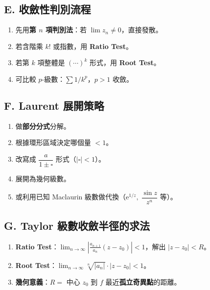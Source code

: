 \documentclass[12pt,a4paper]{article}
\newcommand{\ee}{\mathrm{e}}
\begin{document}
\subsection*{E. 收斂性判別流程}

\begin{enumerate}[nosep]
\item 先用\textbf{第 $n$ 項判別法}：若 $\lim z_n\ne 0$，直接發散。
\item 若含階乘 $k!$ 或指數，用 \textbf{Ratio Test}。
\item 若第 $k$ 項整體是 $(\cdots)^k$ 形式，用 \textbf{Root Test}。
\item 可比較 $p$-級數：$\sum 1/k^p$，$p>1$ 收斂。
\end{enumerate}

\subsection*{F. Laurent 展開策略}

\begin{enumerate}[nosep]
\item 做\textbf{部分分式}分解。
\item 根據環形區域決定哪個量 $<1$。
\item 改寫成 $\dfrac{a}{1\pm\square}$ 形式（$|\square|<1$）。
\item 展開為幾何級數。
\item 或利用已知 Maclaurin 級數做代換（$\ee^{1/z},\;\dfrac{\sin z}{z^n}$ 等）。
\end{enumerate}

\subsection*{G. Taylor 級數收斂半徑的求法}

\begin{enumerate}[nosep]
\item \textbf{Ratio Test}：$\displaystyle\lim_{n\to\infty}\left|\frac{a_{n+1}}{a_n}(z-z_0)\right|<1$，解出 $|z-z_0|<R$。
\item \textbf{Root Test}：$\displaystyle\lim_{n\to\infty}\sqrt[n]{|a_n|}\cdot|z-z_0|<1$。
\item \textbf{幾何意義}：$R=$ 中心 $z_0$ 到 $f$ 最近\textbf{孤立奇異點}的距離。
\end{enumerate}
\end{document}
